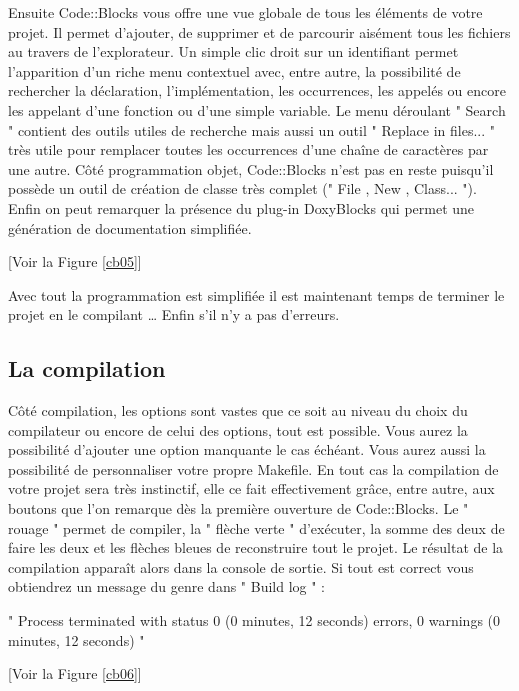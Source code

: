 \documentclass[a4paper, 12pt]{article}
\begin{document}
\begin{onehalfspacing}

	Ensuite Code::Blocks vous offre une vue globale de tous les éléments de votre projet. Il permet d'ajouter, de supprimer et de parcourir aisément tous les fichiers au travers de l'explorateur. Un simple clic droit sur un identifiant permet l'apparition d'un riche menu contextuel avec, entre autre, la possibilité de rechercher la déclaration, l'implémentation, les occurrences, les appelés ou encore les appelant d'une fonction ou d'une simple variable. Le menu déroulant " Search " contient des outils utiles de recherche mais aussi un outil " Replace in files... " très utile pour remplacer toutes les occurrences d'une chaîne de caractères par une autre. Côté programmation objet, Code::Blocks n'est pas en reste puisqu'il possède un outil de création de classe très complet (" File , New , Class... "). Enfin on peut remarquer la présence du plug-in DoxyBlocks qui permet une génération de documentation simplifiée.


[Voir la Figure \ref{cb05}]


	Avec tout la programmation est simplifiée il est maintenant temps de terminer le projet en le compilant … Enfin s'il n'y a pas d'erreurs.

\subsection{La compilation}
Côté compilation, les options sont vastes que ce soit au niveau du choix du compilateur ou encore de celui des options, tout est possible. Vous aurez la possibilité d'ajouter une option manquante le cas échéant. Vous aurez aussi la possibilité de personnaliser votre propre Makefile. En tout cas la compilation de votre projet sera très instinctif, elle ce fait effectivement grâce, entre autre, aux boutons que l'on remarque dès la première ouverture de Code::Blocks. Le " rouage " permet de compiler, la " flèche verte " d'exécuter, la somme des deux de faire les deux et les flèches bleues de reconstruire tout le projet. Le résultat de la compilation apparaît alors dans la console de sortie. Si tout est correct vous obtiendrez un message du genre dans " Build log " :
\begin{center}" Process terminated with status 0 (0 minutes, 12 seconds)  errors, 0 warnings (0 minutes, 12 seconds) "
\end{center}

[Voir la Figure \ref{cb06}]



\end{onehalfspacing}
\end{document}
